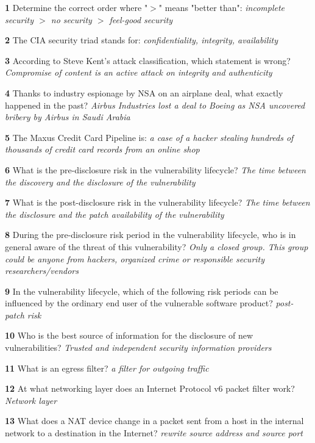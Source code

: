 

 
\textbf{  1}  Determine the correct order where "$>$" means "better than":  
\textit{ incomplete security $>$ no security $>$ feel-good security}

\textbf{  2}  The CIA security triad stands for:  
\textit{ confidentiality, integrity, availability}

\textbf{  3}  According to Steve Kent's attack classification, which statement is wrong?  
\textit{ Compromise of content is an active attack on integrity and authenticity}

\textbf{  4}  Thanks to industry espionage by NSA on an airplane deal, what exactly happened in the past?  
\textit{ Airbus Industries lost a deal to Boeing as NSA uncovered bribery by Airbus in Saudi Arabia}

\textbf{  5}  The Maxus Credit Card Pipeline is:  
\textit{ a case of a hacker stealing hundreds of thousands of credit card records from an online shop}

\textbf{  6}  What is the pre-disclosure risk in the vulnerability lifecycle?  
\textit{ The time between the discovery and the disclosure of the vulnerability}

\textbf{  7}  What is the post-disclosure risk in the vulnerability lifecycle?  
\textit{ The time between the disclosure and the patch availability of the vulnerability}

\textbf{  8}  During the pre-disclosure risk period in the vulnerability lifecycle, who is in general aware of the threat of this vulnerability? 
\textit{ Only a closed group. This group could be anyone from hackers, organized crime or responsible security researchers/vendors}

\textbf{  9}  In the vulnerability lifecycle, which of the following risk periods can be influenced by the ordinary end user of the vulnerable software product? 
\textit{ post-patch risk}

\textbf{  10}  Who is the best source of information for the disclosure of new vulnerabilities?  
\textit{ Trusted and independent security information providers}

\textbf{  11}  What is an egress filter?  
\textit{ a filter for outgoing traffic}

\textbf{  12}  At what networking layer does an Internet Protocol v6 packet filter work?  
\textit{ Network layer}

\textbf{  13}   What does a NAT device change in a packet sent from a host in the internal network to a destination in the Internet? 
\textit{ rewrite source address and source port}

